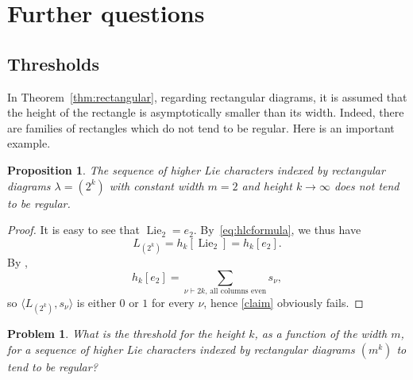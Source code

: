 \documentclass[12pt]%
{amsart}
\newcommand{\la}{{\lambda}}
\newcommand{\Lie}{\operatorname{Lie}}
\theoremstyle{plain}
\newtheorem{proposition}[theorem]{Proposition}
\newtheorem{conjecture}[theorem]{Conjecture}
\newtheorem{problem}[theorem]{Problem}
\theoremstyle{definition}
\theoremstyle{remark}
\newcommand{\todo}[1]{\vspace{5 mm}\par \noindent
	\marginpar{\textsc{ToDo}} \framebox{\begin{minipage}[c]{0.95
				\textwidth}
			#1 \end{minipage}}\vspace{5 mm}\par}
\begin{document}
\section{Further questions}\label{sec:questions}

\subsection{Thresholds}

In Theorem~\ref{thm:rectangular}, regarding rectangular diagrams, it is assumed that the height of the rectangle is asymptotically smaller than its width. 
Indeed, there are families of rectangles which do not tend to be regular. Here is an important example. 

\begin{proposition}\label{prop:2xn}
    The sequence of higher Lie characters indexed by rectangular diagrams $\la=(2^k)$ with constant width $m=2$ and height $k\to\infty$ does not tend to be regular.
\end{proposition}
\begin{proof}
    It is easy to see that $\Lie_2=e_2$. By~\eqref{eq:hlcformula}, we thus have 
    \[
        L_{(2^k)} = h_k[\Lie_2] = h_k[e_2].
    \]
    By \cite[Ex.~I.8.6]{Macdonald},
    \[
        h_k[e_2]
        = \sum_{\nu \vdash 2k,\, \text{all columns even}} s_\nu,
    \]
    so $\langle L_{(2^k)},s_\nu\rangle$ is either $0$ or $1$ for every $\nu$, hence \eqref{claim} obviously fails. 
\end{proof}

\begin{problem}
    What is the threshold for the height $k$, as a function of the width $m$, for a sequence of higher Lie characters indexed by rectangular diagrams $(m^k)$ to tend to be regular?
\end{problem}



\end{document}
